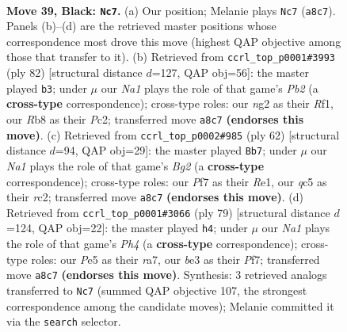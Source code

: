 \documentclass[11pt]{article}
\begin{document}
\clearpage

\begin{figure}[p]\centering
\begin{subfigure}{0.46\textwidth}\centering
\resizebox{\linewidth}{!}{%
\newchessgame
\chessboard[
  setfen={nr4k1/1r3pb1/R7/2Q1p3/4P3/4Bn2/3NKRN1/7q b - - 3 39},
  showmover=false,
  pgfstyle=straightmove, color=movearrow, markmove={a8-c7}
]}
\caption{}
\end{subfigure}\hfill
\begin{subfigure}{0.46\textwidth}\centering
\resizebox{\linewidth}{!}{%
\newchessgame
\chessboard[
  setfen={4r1n1/p4k1p/1r3bp1/8/3NNR2/p7/1PP3P1/1K3R2 w - - 0 42},
  showmover=false,
  pgfstyle=straightmove, color=movearrow, markmove={b2-b3}
]}
\caption{}
\end{subfigure}
\\[4pt]
\begin{subfigure}{0.46\textwidth}\centering
\resizebox{\linewidth}{!}{%
\newchessgame
\chessboard[
  setfen={6k1/6pb/Qn1q3p/4N3/P2P4/6P1/2r2rB1/3RR1K1 w - - 1 32},
  showmover=false,
  pgfstyle=straightmove, color=movearrow, markmove={g2-b7}
]}
\caption{}
\end{subfigure}\hfill
\begin{subfigure}{0.46\textwidth}\centering
\resizebox{\linewidth}{!}{%
\newchessgame
\chessboard[
  setfen={5rk1/R4pp1/5b2/3Qn2p/8/6P1/2q4P/5RBK b - - 3 40},
  showmover=false,
  pgfstyle=straightmove, color=movearrow, markmove={h5-h4}
]}
\caption{}
\end{subfigure}
\caption{\textbf{Move 39, Black: \texttt{Nc7}.} (a) Our position; Melanie plays \texttt{Nc7} (\texttt{a8c7}). Panels (b)--(d) are the retrieved master positions whose correspondence most drove this move (highest QAP objective among those that transfer to it). (b) Retrieved from \texttt{ccrl\_top\_p0001\#3993} (ply 82) [structural distance $d$=127, QAP obj=56]: the master played \texttt{b3}; under $\mu$ our \emph{Na1} plays the role of that game's \emph{Pb2} (a \textbf{cross-type} correspondence); cross-type roles: our \emph{n}g2 as their \emph{R}f1, our \emph{R}b8 as their \emph{P}c2; transferred move \texttt{a8c7} \textbf{(endorses this move)}. (c) Retrieved from \texttt{ccrl\_top\_p0002\#985} (ply 62) [structural distance $d$=94, QAP obj=29]: the master played \texttt{Bb7}; under $\mu$ our \emph{Na1} plays the role of that game's \emph{Bg2} (a \textbf{cross-type} correspondence); cross-type roles: our \emph{P}f7 as their \emph{R}e1, our \emph{q}c5 as their \emph{r}c2; transferred move \texttt{a8c7} \textbf{(endorses this move)}. (d) Retrieved from \texttt{ccrl\_top\_p0001\#3066} (ply 79) [structural distance $d$=124, QAP obj=22]: the master played \texttt{h4}; under $\mu$ our \emph{Na1} plays the role of that game's \emph{Ph4} (a \textbf{cross-type} correspondence); cross-type roles: our \emph{P}e5 as their \emph{r}a7, our \emph{b}e3 as their \emph{P}f7; transferred move \texttt{a8c7} \textbf{(endorses this move)}. Synthesis: 3 retrieved analogs transferred to \texttt{Nc7} (summed QAP objective 107, the strongest correspondence among the candidate moves); Melanie committed it via the \texttt{search} selector.}
\label{fig:thought-m77}
\end{figure}
\end{document}
